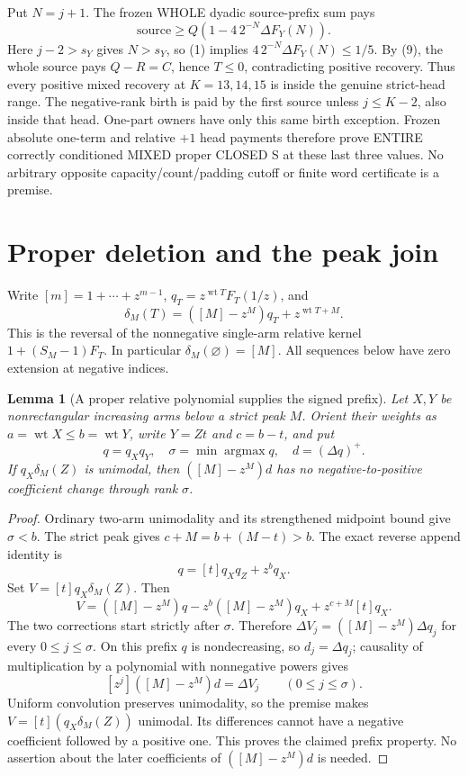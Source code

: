 \documentclass[11pt]{article}
\newtheorem{lemma}[proposition]{Lemma}
\begin{document}
Put $N=j+1$. The frozen WHOLE dyadic source-prefix sum pays
\[
             \text{source}\ge Q\left(1-4\,2^{-N}\Delta F_Y(N)\right).
\]
Here $j-2>s_Y$ gives $N>s_Y$, so (1) implies
$4\,2^{-N}\Delta F_Y(N)\le1/5$.
By (9), the whole source pays $Q-R=C$, hence $T\le0$, contradicting
positive recovery. Thus every positive mixed recovery at $K=13,14,15$
is inside the genuine strict-head range. The negative-rank birth is
paid by the first source unless $j\le K-2$, also inside that head.
One-part owners have only this same birth exception.
Frozen absolute one-term and relative $+1$ head payments therefore
prove ENTIRE correctly conditioned MIXED proper CLOSED S at these
last three values. No arbitrary opposite capacity/count/padding cutoff
or finite word certificate is a premise.

\section{Proper deletion and the peak join}

\par\medskip

Write $[m]=1+\cdots+z^{m-1}$, $q_T=z^{\operatorname{wt}T}F_T(1/z)$,
and
\[
 \delta_M(T)=([M]-z^M)q_T+z^{\operatorname{wt}T+M}.
\]
This is the reversal of the nonnegative single-arm relative kernel
$1+(S_M-1)F_T$. In particular $\delta_M(\varnothing)=[M]$.
All sequences below have zero extension at negative indices.

\begin{lemma}[A proper relative polynomial supplies the signed prefix]
Let $X,Y$ be nonrectangular increasing arms below a strict peak $M$.
Orient their weights as $a=\operatorname{wt}X\le b=\operatorname{wt}Y$,
write $Y=Zt$ and $c=b-t$, and put
\[
 q=q_Xq_Y,\quad \sigma=\min\operatorname{argmax}q,
 \quad d=(\Delta q)^+.
\]
If $q_X\delta_M(Z)$ is unimodal, then $([M]-z^M)d$
has no negative-to-positive coefficient change through rank $\sigma$.
\end{lemma}
\begin{proof}
Ordinary two-arm unimodality and its strengthened midpoint bound
give $\sigma<b$. The strict peak gives $c+M=b+(M-t)>b$.
The exact reverse append identity is
\[
 q=[t]q_Xq_Z+z^bq_X.
\]
Set $V=[t]q_X\delta_M(Z)$. Then
\[
 V=([M]-z^M)q-z^b([M]-z^M)q_X
                      +z^{c+M}[t]q_X.
\]
The two corrections start strictly after $\sigma$. Therefore
$\Delta V_j=([M]-z^M)\Delta q_j$ for every $0\le j\le\sigma$.
On this prefix $q$ is nondecreasing, so $d_j=\Delta q_j$;
causality of multiplication by a polynomial with nonnegative powers
gives
\[
                 [z^j]([M]-z^M)d=\Delta V_j
                       \qquad(0\le j\le\sigma).
\]
Uniform convolution preserves unimodality, so the premise makes
$V=[t](q_X\delta_M(Z))$ unimodal. Its differences cannot have
a negative coefficient followed by a positive one. This proves
the claimed prefix property. No assertion about the later
coefficients of $([M]-z^M)d$ is needed.
\end{proof}
\end{document}
